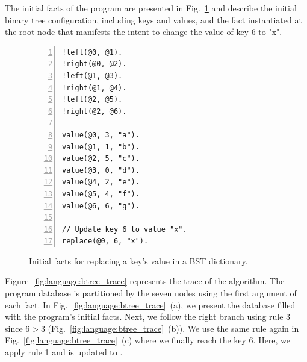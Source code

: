 The initial facts of the program are presented in
Fig.~\ref{code:language:btree_replace_initial} and describe the initial binary
tree configuration, including keys and values, and the  fact instantiated at the root node  that manifests the intent to
change the value of key 6 to "x".

\begin{figure}[ht]
\begin{Verbatim}[numbers=left,fontsize=\codesize,commandchars=\*\{\}]
!left(@0, @1).
!right(@0, @2).
!left(@1, @3).
!right(@1, @4). 
!left(@2, @5).
!right(@2, @6).

value(@0, 3, "a").
value(@1, 1, "b").
value(@2, 5, "c").
value(@3, 0, "d").
value(@4, 2, "e").
value(@5, 4, "f").
value(@6, 6, "g").

// Update key 6 to value "x".
replace(@0, 6, "x").
\end{Verbatim}
\caption{Initial facts for replacing a key's value in a BST dictionary.}
\label{code:language:btree_replace_initial}
\end{figure}

Figure~\ref{fig:language:btree_trace} represents the trace of the algorithm. The program
database is partitioned by the seven nodes using the first argument of each
fact. In Fig.~\ref{fig:language:btree_trace}~(a), we present the database filled with the
program's initial facts. Next, we follow the right branch using rule 3 since $6
> 3$ (Fig.~\ref{fig:language:btree_trace}~(b)).  We use the same rule again in
Fig.~\ref{fig:language:btree_trace}~(c) where we finally reach the key 6. Here, we apply
rule 1 and  is updated to .

